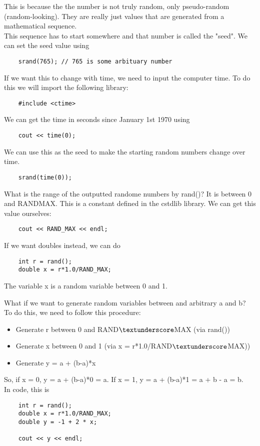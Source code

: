 \documentclass[]{article}
\begin{document}
This is because the the number is not truly random, only pseudo-random (random-looking). They are really just values that are generated from a mathematical sequence.\\

This sequence has to start somewhere and that number is called the "seed". We can set the seed value using

\begin{lstlisting}
	srand(765);	// 765 is some arbituary number
\end{lstlisting}

If we want this to change with time, we need to input the computer time. To do this we will import the following library:

\begin{lstlisting}
	#include <ctime>
\end{lstlisting}

We can get the time in seconds since January 1st 1970 using

\begin{lstlisting}
	cout << time(0);
\end{lstlisting}

We can use this as the seed to make the starting random numbers change over time.

\begin{lstlisting}
	srand(time(0));
\end{lstlisting}

What is the range of the outputted randome numbers by rand()? It is between 0 and RAND\textunderscore MAX. This is a constant defined in the cstdlib library. We can get this value ourselves:

\begin{lstlisting}
	cout << RAND_MAX << endl;
\end{lstlisting}

If we want doubles instead, we can do

\begin{lstlisting}
	int r = rand();
	double x = r*1.0/RAND_MAX;
\end{lstlisting}

The variable x is a random variable between 0 and 1.\\\bigbreak

What if we want to generate random variables between and arbitrary a and b? To do this, we need to follow this procedure:
\begin{itemize}
	\item Generate r between 0 and RAND$\textunderscore$MAX (via rand())
	\item Generate x between 0 and 1 (via x = r*1.0/RAND$\textunderscore$MAX))
	\item Generate y = a + (b-a)*x
\end{itemize} 

So, if x = 0, y = a + (b-a)*0 = a. If x = 1, y = a + (b-a)*1 = a + b - a = b.\\

In code, this is

\begin{lstlisting}
	int r = rand();
	double x = r*1.0/RAND_MAX;
	double y = -1 + 2 * x;
	
	cout << y << endl;
\end{lstlisting}
\end{document}

